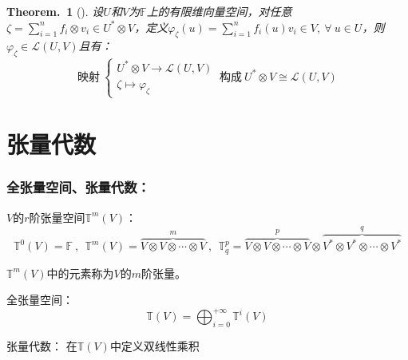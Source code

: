\documentclass[zihao=-4,UTF8]{report}
\def\F{\mathbb{F}}
\def\T{\mathbb{T}}
\theoremstyle{mystyle} %
\newtheorem{theorem}{Theorem.\,}
\begin{document}
\begin{theorem}[]\label{}
设$U$和$V$为$\F$上的有限维向量空间，对任意$\zeta = \sum_{i=1}^{n}f_i\otimes v_i \in U^*\otimes V $，定义$\varphi_{\zeta}(u) = \sum_{i=1}^{n}f_i(u)v_i \in V,\ \forall\ u\in U$，则$\varphi_{\zeta} \in \mathscr{L}(U,V)$且有：
\begin{equation*}
    \text{映射}\ \begin{cases}
        U^*\otimes V \longrightarrow \mathscr{L}(U,V)\\
        \zeta \longmapsto \varphi_{\zeta}
    \end{cases} \ \text{构成}\ U^*\otimes V \cong \mathscr{L}(U,V)
\end{equation*}

\section{张量代数}

\end{theorem}

\subsubsection{全张量空间、张量代数：}

$V$的$r$阶张量空间$\T^m(V)$：
\begin{equation*}
    \T^0(V) = \mathbb{F}\ ,\ \  \T^m(V) = \overset{m}{\overbrace{V\otimes V \otimes \cdots \otimes V}}\ ,\ \ \T^p_q = \overset{p}{\overbrace{V\otimes V \otimes \cdots \otimes V}}\otimes \overset{q}{\overbrace{V^*\otimes V^* \otimes \cdots \otimes V^*}}
\end{equation*}
{\par\color{gray}\small
$\T^m(V)$中的元素称为$V$的$m$阶张量。
\par}

全张量空间：
\begin{equation*}
    \T(V) = \bigoplus^{+\infty}_{i=0} \T^i(V)
\end{equation*}

张量代数：
在$\T(V)$中定义双线性乘积
\end{document}
